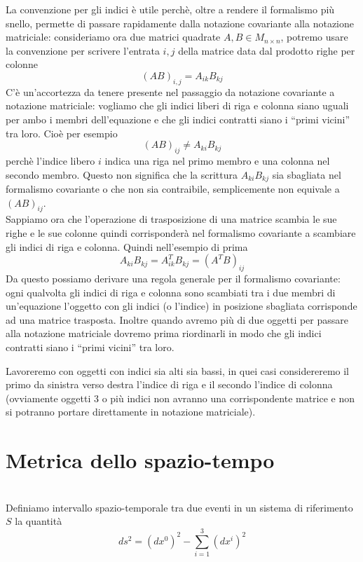 \documentclass[12pt,a4paper,titlepage, twoside, openright]{book}
\newenvironment{definizione}[1][\empty]{\begin{Definizione}{
\ifx\empty#1\relax\else\mdseries\itshape#1\\\fi
}{}}{\end{Definizione}}
\numberwithin{equation}{chapter}
\begin{document}
La convenzione per gli indici è utile perchè, oltre a rendere il formalismo più snello, permette di passare rapidamente dalla notazione covariante alla notazione matriciale: consideriamo ora due matrici quadrate $A,B \in M_{n\times n}$, potremo usare la convenzione per scrivere l'entrata $i,j$ della matrice data dal prodotto righe per colonne
\[
(AB)_{i,j}=A_{ik}B_{kj}
\]
C'è un'accortezza da tenere presente nel passaggio da notazione covariante a notazione matriciale: vogliamo che gli indici liberi di riga e colonna siano uguali per ambo i membri dell'equazione e che gli indici contratti siano i ``primi vicini'' tra loro.
Cioè per esempio 
\[
(AB)_{ij}\neq A_{ki}B_{kj}
\]
perchè l'indice libero $i$ indica una riga nel primo membro e una colonna nel secondo membro. Questo non significa che la scrittura $A_{ki}B_{kj}$ sia sbagliata nel formalismo covariante o che non sia contraibile, semplicemente non equivale a $(AB)_{ij}$.\\
Sappiamo ora che l'operazione di trasposizione di una matrice scambia le sue righe e le sue colonne quindi corrisponderà nel formalismo covariante a scambiare gli indici di riga e colonna. Quindi nell'esempio di prima
\[
A_{ki}B_{kj}=A^T_{ik}B_{kj}=(A^T B)_{ij}
\]
Da questo possiamo derivare una regola generale per il formalismo covariante: ogni qualvolta gli indici di riga e colonna sono scambiati tra i due membri di un'equazione l'oggetto con gli indici (o l'indice) in posizione sbagliata corrisponde ad una matrice trasposta.
Inoltre quando avremo più di due oggetti per passare alla notazione matriciale dovremo prima riordinarli in modo che gli indici contratti siano i ``primi vicini'' tra loro.


Lavoreremo con oggetti con indici sia alti sia bassi, in quei casi considereremo il primo da sinistra verso destra l'indice di riga e il secondo l'indice di colonna (ovviamente oggetti 3 o più indici non avranno una corrispondente matrice e non si potranno portare direttamente in notazione matriciale).

\section{Metrica dello spazio-tempo}\label{sezMetrica}

\begin{definizione}
Definiamo intervallo spazio-temporale tra due eventi in un sistema di riferimento $S$ la quantità
\[ds^2= (dx^0)^2-\sum_{i=1}^3 (dx^i)^2
\]
\end{definizione}
\end{document}
